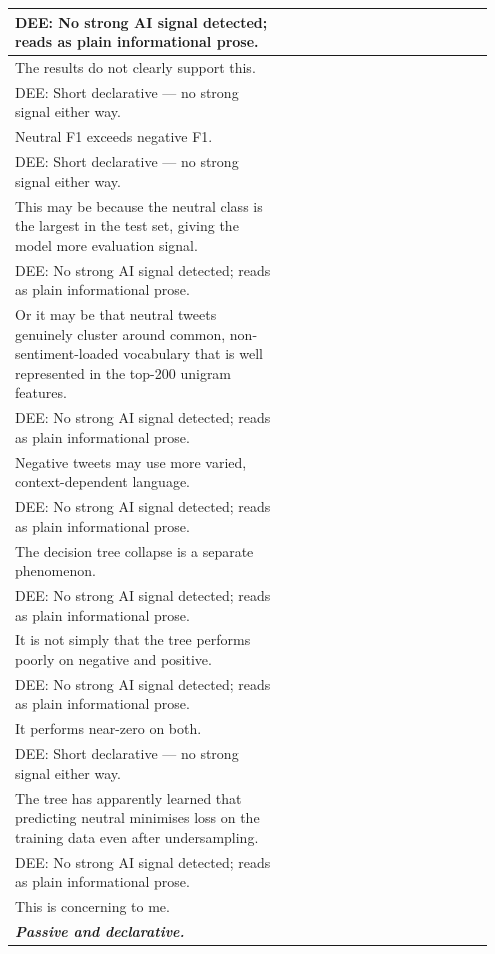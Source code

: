 \documentclass[11pt]{article}
\begin{document}
\begin{longtable}{|p{0.55\linewidth}|p{0.40\linewidth}|}
\hline
DEE: No strong AI signal detected; reads as plain informational prose. & \\
\hline
The results do not clearly support this. & \\[2pt]
\hline
DEE: Short declarative --- no strong signal either way. & \\
\hline
Neutral F1 exceeds negative F1. & \\[2pt]
\hline
DEE: Short declarative --- no strong signal either way. & \\
\hline
This may be because the neutral class is the largest in the test set, giving the model more evaluation signal. & \\[2pt]
\hline
DEE: No strong AI signal detected; reads as plain informational prose. & \\
\hline
Or it may be that neutral tweets genuinely cluster around common, non-sentiment-loaded vocabulary that is well represented in the top-200 unigram features. & \\[2pt]
\hline
DEE: No strong AI signal detected; reads as plain informational prose. & \\
\hline
Negative tweets may use more varied, context-dependent language. & \\[2pt]
\hline
DEE: No strong AI signal detected; reads as plain informational prose. & \\
\hline
The decision tree collapse is a separate phenomenon. & \\[2pt]
\hline
DEE: No strong AI signal detected; reads as plain informational prose. & \\
\hline
It is not simply that the tree performs poorly on negative and positive. & \\[2pt]
\hline
DEE: No strong AI signal detected; reads as plain informational prose. & \\
\hline
It performs near-zero on both. & \\[2pt]
\hline
DEE: Short declarative --- no strong signal either way. & \\
\hline
The tree has apparently learned that predicting neutral minimises loss on the training data even after undersampling. & \\[2pt]
\hline
DEE: No strong AI signal detected; reads as plain informational prose. & \\
\hline
This is concerning to me. & \\[2pt]
\hline
\textbf{\textit{Passive and declarative.}}\vspace{2em} & \\

\end{longtable}
\end{document}

